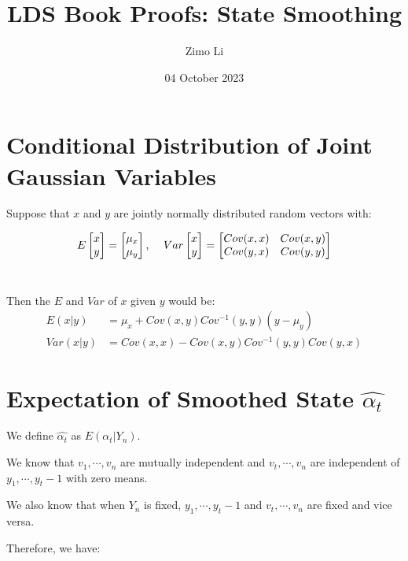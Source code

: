 \documentclass{article}
\title{LDS Book Proofs: State Smoothing}
\author{Zimo Li}
\date{04 October 2023}
\begin{document}
\maketitle

\section{Conditional Distribution of Joint Gaussian Variables}

Suppose that \(x\) and \(y\) are jointly normally distributed random vectors with:

\[
E
\begin{bmatrix}
x\\
y
\end{bmatrix}
=
\begin{bmatrix}
\mu_{x}\\
\mu_{y}
\end{bmatrix} \text{, }\quad
\centering
Var
\begin{bmatrix}
x\\
y
\end{bmatrix}
=
\begin{bmatrix}
Cov(x,x) & Cov(x,y)\\
Cov(y,x) & Cov(y,y)
\end{bmatrix}
\]\\

\par\noindent
Then the \(E\) and \(Var\) of \(x\) given \(y\) would be:
\begin{align*}
    E(x|y) &= \mu_x + Cov(x,y)Cov^{-1}(y,y)(y-\mu_{y})\\
    Var(x|y) &= Cov(x,x) - Cov(x,y)Cov^{-1}(y,y)Cov(y,x)
\end{align*}

\section{Expectation of Smoothed State \(\hat{\alpha_t}\)}

We define  \(\hat{\alpha_t}\) as \(E(\alpha_{t}|Y_{n})\). \\
\par\noindent
We know that \(v_1, \cdots, v_n\) are mutually independent and \(v_t, \cdots, v_n\) are independent of \(y_1, \cdots, y_t-1\) with zero means.\\
\par\noindent
We also know that when \(Y_n\) is fixed, \(y_1, \cdots, y_t-1\) and \(v_t, \cdots, v_n\) are fixed and vice versa.\\
\par\noindent
Therefore, we have:
\end{document}
